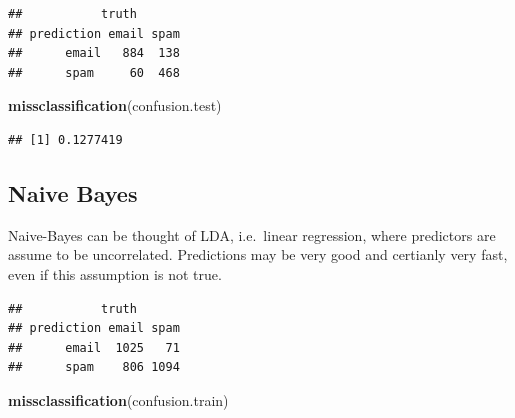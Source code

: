 \documentclass[]{book}
\newenvironment{Shaded}{\begin{snugshade}}{\end{snugshade}}
\newcommand{\KeywordTok}[1]{\textcolor[rgb]{0.13,0.29,0.53}{\textbf{#1}}}
\newcommand{\DataTypeTok}[1]{\textcolor[rgb]{0.13,0.29,0.53}{#1}}
\newcommand{\DecValTok}[1]{\textcolor[rgb]{0.00,0.00,0.81}{#1}}
\newcommand{\StringTok}[1]{\textcolor[rgb]{0.31,0.60,0.02}{#1}}
\newcommand{\CommentTok}[1]{\textcolor[rgb]{0.56,0.35,0.01}{\textit{#1}}}
\newcommand{\OperatorTok}[1]{\textcolor[rgb]{0.81,0.36,0.00}{\textbf{#1}}}
\newcommand{\NormalTok}[1]{#1}
\theoremstyle{definition}
\theoremstyle{definition}
\theoremstyle{definition}
\theoremstyle{remark}
\begin{document}
\begin{verbatim}
##           truth
## prediction email spam
##      email   884  138
##      spam     60  468
\end{verbatim}

\begin{Shaded}
\begin{Highlighting}[]
\KeywordTok{missclassification}\NormalTok{(confusion.test)}
\end{Highlighting}
\end{Shaded}

\begin{verbatim}
## [1] 0.1277419
\end{verbatim}

\subsection{Naive Bayes}\label{naive-bayes}

Naive-Bayes can be thought of LDA, i.e.~linear regression, where
predictors are assume to be uncorrelated. Predictions may be very good
and certianly very fast, even if this assumption is not true.

\begin{Shaded}
\end{Shaded}

\begin{verbatim}
##           truth
## prediction email spam
##      email  1025   71
##      spam    806 1094
\end{verbatim}

\begin{Shaded}
\begin{Highlighting}[]
\KeywordTok{missclassification}\NormalTok{(confusion.train)}
\end{Highlighting}
\end{Shaded}
\end{document}
